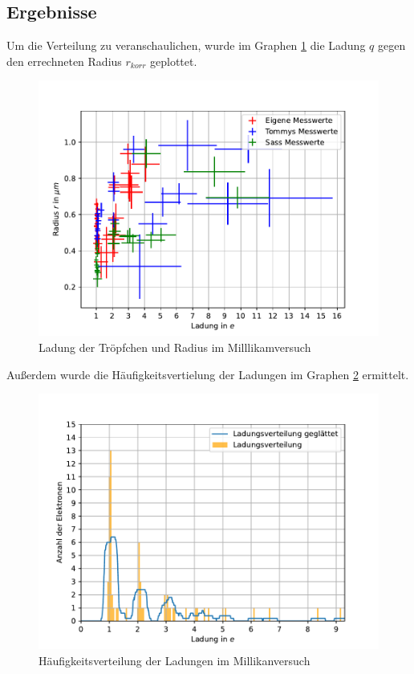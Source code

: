 \documentclass[11pt, a4paper]{article}
\begin{document}
    \subsection{Ergebnisse}
    Um die Verteilung zu veranschaulichen, wurde im Graphen \ref{fig:milllikam} die Ladung $q$ gegen den errechneten Radius $r_{korr}$ geplottet.
    \begin{figure}[h]
        \centering
        \includegraphics[width=\textwidth]{millikan.pdf}
        \caption{Ladung der Tröpfchen und Radius im Milllikamversuch}
        \label{fig:milllikam}
    \end{figure}
    Außerdem wurde die Häufigkeitsvertielung der Ladungen im Graphen \ref{fig:hauf} ermittelt.

    \begin{figure}[h]
        \centering
        \includegraphics[width=\textwidth]{Ladungsverteilung.pdf}
        \caption{Häufigkeitsverteilung der Ladungen im Millikanversuch}
        \label{fig:hauf}
    \end{figure}
    
\end{document}
